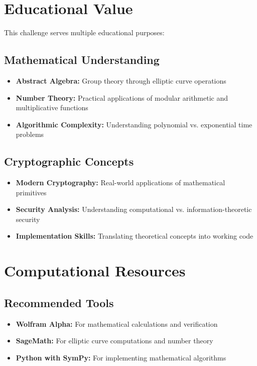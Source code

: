 \documentclass[11pt,a4paper]{article}
\begin{document}
\section{Educational Value}

This challenge serves multiple educational purposes:

\subsection{Mathematical Understanding}

\begin{itemize}
    \item \textbf{Abstract Algebra:} Group theory through elliptic curve operations
    \item \textbf{Number Theory:} Practical applications of modular arithmetic and multiplicative functions
    \item \textbf{Algorithmic Complexity:} Understanding polynomial vs. exponential time problems
\end{itemize}

\subsection{Cryptographic Concepts}

\begin{itemize}
    \item \textbf{Modern Cryptography:} Real-world applications of mathematical primitives
    \item \textbf{Security Analysis:} Understanding computational vs. information-theoretic security
    \item \textbf{Implementation Skills:} Translating theoretical concepts into working code
\end{itemize}

\section{Computational Resources}

\subsection{Recommended Tools}

\begin{itemize}
    \item \textbf{Wolfram Alpha:} For mathematical calculations and verification
    \item \textbf{SageMath:} For elliptic curve computations and number theory
    \item \textbf{Python with SymPy:} For implementing mathematical algorithms
\end{itemize}
\end{document}
